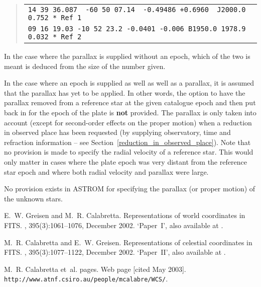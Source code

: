 \documentclass[twoside,11pt]{article}
\renewcommand{\_}{\texttt{\symbol{95}}}
\begin{document}
\goodbreak
\begin{quote}
\begin{small}
\begin{tabular}{|l|}
\hline
\verb|14 39 36.087  -60 50 07.14  -0.49486 +0.6960  J2000.0  0.752 * Ref 1| \\
\verb|09 16 19.03 -10 52 23.2 -0.0401 -0.006 B1950.0 1978.9 0.032 * Ref 2| \\
\hline
\end{tabular}
\end{small}
\end{quote}

In the case where the parallax is supplied without an epoch, which of
the two is meant is deduced from the size of the number given.

In the case where an epoch is supplied as well as well as a parallax,
it is assumed that the parallax has yet to be applied.  In other words,
the option to have the parallax removed from a reference star at the
given catalogue epoch and then put back in for the epoch of the plate
is \textbf{not} provided.  The parallax is only taken into account
(except for second-order effects on the proper motion) when a reduction
in observed place has been requested (by supplying observatory, time and
refraction information -- see Section~\ref{reduction_in_observed_place}).
Note that no provision is made to specify the radial velocity of a
reference star.  This would only matter in cases where the plate epoch
was very distant from the reference star epoch and where both radial
velocity and parallax were large.

No provision exists in ASTROM for specifying the parallax (or proper motion)
of the unknown stars.

%
%
\begin{thebibliography}{1}

E.~W. Greisen and M.~R. Calabretta.
\newblock Representations of world coordinates in {FITS}.
, 395(3):1061--1076, December 2002.
\newblock `Paper~I', also available at \cite{fitswcsurl}.

M.~R. Calabretta and E.~W. Greisen.
\newblock Representations of celestial coordinates in {FITS}.
, 395(3):1077--1122, December 2002.
\newblock `Paper~II', also available at \cite{fitswcsurl}.

M.~R. Calabretta et~al.
 pages.
\newblock Web page [cited May 2003].
\newblock \texttt{http://www.atnf.csiro.au/people/mcalabre/WCS/}.

\end{thebibliography}
\end{document}
